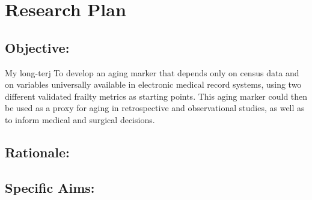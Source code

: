 \section{Research Plan }\label{research-plan}


\subsection{Objective:}\label{objective}
  

My long-terj
To develop an aging marker\cite{Orkaby_2017} that depends only on census data and on
variables universally available in electronic medical record systems,
using two different validated frailty metrics as starting points. This
aging marker could then be used as a proxy for aging in retrospective
and observational studies, as well as to inform medical and surgical
decisions.


\subsection{Rationale:}\label{rationale}

\subsection{Specific Aims:}\label{specific-aims}
